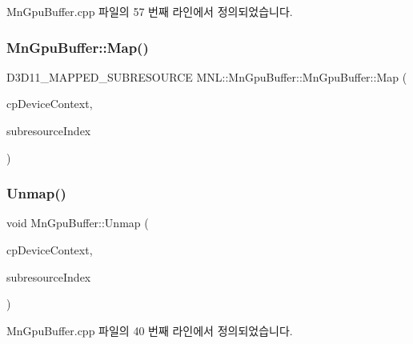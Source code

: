 Mn\+Gpu\+Buffer.\+cpp 파일의 57 번째 라인에서 정의되었습니다.

\mbox{\label{class_m_n_l_1_1_mn_gpu_buffer_aa28d7626be0829bb89db594cf253c62d}} 
\subsubsection{\texorpdfstring{Mn\+Gpu\+Buffer\+::\+Map()}{MnGpuBuffer::Map()}}
{\footnotesize\ttfamily D3\+D11\+\_\+\+M\+A\+P\+P\+E\+D\+\_\+\+S\+U\+B\+R\+E\+S\+O\+U\+R\+CE M\+N\+L\+::\+Mn\+Gpu\+Buffer\+::\+Mn\+Gpu\+Buffer\+::\+Map (\begin{DoxyParamCaption}\item[{const \hyperlink{namespace_m_n_l_aab3aabb6c9360e44ddc8b0bb563c2107}{C\+P\+D3\+D\+Device\+Context} \&}]{cp\+Device\+Context,  }\item[{U\+I\+NT}]{subresource\+Index }\end{DoxyParamCaption})}

\mbox{\label{class_m_n_l_1_1_mn_gpu_buffer_a152eb5876d380e888a065328da057330}} 
\subsubsection{\texorpdfstring{Unmap()}{Unmap()}}
{\footnotesize\ttfamily void Mn\+Gpu\+Buffer\+::\+Unmap (\begin{DoxyParamCaption}\item[{const \hyperlink{namespace_m_n_l_aab3aabb6c9360e44ddc8b0bb563c2107}{C\+P\+D3\+D\+Device\+Context} \&}]{cp\+Device\+Context,  }\item[{U\+I\+NT}]{subresource\+Index }\end{DoxyParamCaption})}



Mn\+Gpu\+Buffer.\+cpp 파일의 40 번째 라인에서 정의되었습니다.

\mbox{\label{class_m_n_l_1_1_mn_gpu_buffer_a77c025ff683cce5025b58e87d28d7549}} 
